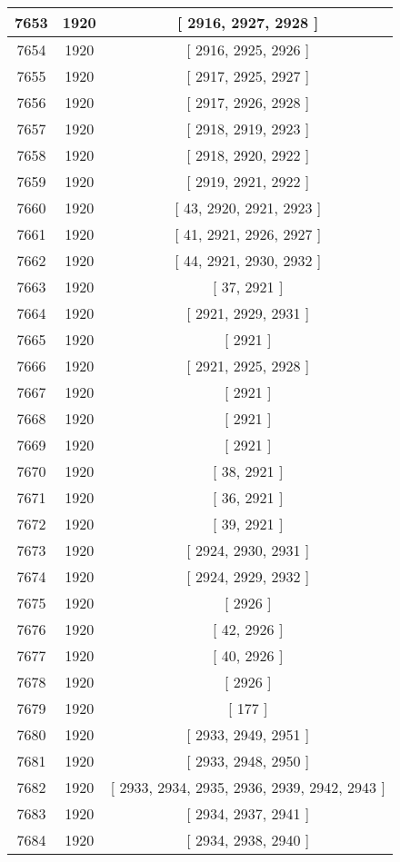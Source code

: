 \begin{center}
\begin{longtable}[H]{|| c c c ||}
7653 & 1920 & [ 2916, 2927, 2928 ] \\ 
\hline
7654 & 1920 & [ 2916, 2925, 2926 ] \\ 
\hline
7655 & 1920 & [ 2917, 2925, 2927 ] \\ 
\hline
7656 & 1920 & [ 2917, 2926, 2928 ] \\ 
\hline
7657 & 1920 & [ 2918, 2919, 2923 ] \\ 
\hline
7658 & 1920 & [ 2918, 2920, 2922 ] \\ 
\hline
7659 & 1920 & [ 2919, 2921, 2922 ] \\ 
\hline
7660 & 1920 & [ 43, 2920, 2921, 2923 ] \\ 
\hline
7661 & 1920 & [ 41, 2921, 2926, 2927 ] \\ 
\hline
7662 & 1920 & [ 44, 2921, 2930, 2932 ] \\ 
\hline
7663 & 1920 & [ 37, 2921 ] \\ 
\hline
7664 & 1920 & [ 2921, 2929, 2931 ] \\ 
\hline
7665 & 1920 & [ 2921 ] \\ 
\hline
7666 & 1920 & [ 2921, 2925, 2928 ] \\ 
\hline
7667 & 1920 & [ 2921 ] \\ 
\hline
7668 & 1920 & [ 2921 ] \\ 
\hline
7669 & 1920 & [ 2921 ] \\ 
\hline
7670 & 1920 & [ 38, 2921 ] \\ 
\hline
7671 & 1920 & [ 36, 2921 ] \\ 
\hline
7672 & 1920 & [ 39, 2921 ] \\ 
\hline
7673 & 1920 & [ 2924, 2930, 2931 ] \\ 
\hline
7674 & 1920 & [ 2924, 2929, 2932 ] \\ 
\hline
7675 & 1920 & [ 2926 ] \\ 
\hline
7676 & 1920 & [ 42, 2926 ] \\ 
\hline
7677 & 1920 & [ 40, 2926 ] \\ 
\hline
7678 & 1920 & [ 2926 ] \\ 
\hline
7679 & 1920 & [ 177 ] \\ 
\hline
7680 & 1920 & [ 2933, 2949, 2951 ] \\ 
\hline
7681 & 1920 & [ 2933, 2948, 2950 ] \\ 
\hline
7682 & 1920 & [ 2933, 2934, 2935, 2936, 2939, 2942, 2943 ] \\ 
\hline
7683 & 1920 & [ 2934, 2937, 2941 ] \\ 
\hline
7684 & 1920 & [ 2934, 2938, 2940 ] \\ 

\end{longtable}
\end{center}
